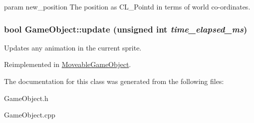 param new\_\-position The position as CL\_\-Pointd in terms of world co-\/ordinates. \hypertarget{classGameObject_ad2f3cd5d1f5a11b237507cd3ee98b95d}{
\subsubsection[{update}]{\setlength{\rightskip}{0pt plus 5cm}bool GameObject::update (unsigned int {\em time\_\-elapsed\_\-ms})}}
\label{classGameObject_ad2f3cd5d1f5a11b237507cd3ee98b95d}
Updates any animation in the current sprite. 

Reimplemented in \hyperlink{classMoveableGameObject_af2a5d981743e85b4bd35a90f874b361b}{MoveableGameObject}.

The documentation for this class was generated from the following files:\begin{DoxyCompactItemize}
\item 
GameObject.h\item 
GameObject.cpp\end{DoxyCompactItemize}
